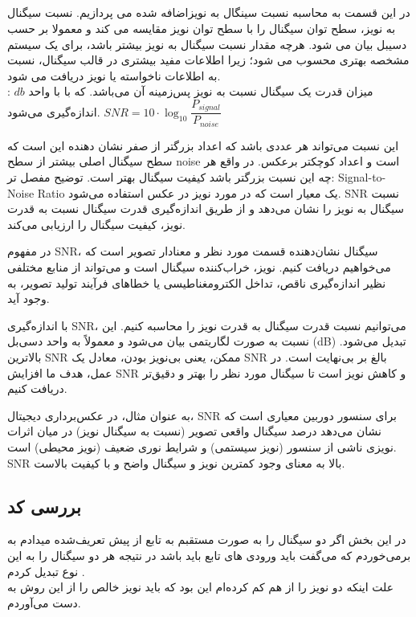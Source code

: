 \subsection{}
در این قسمت به محاسبه نسبت سینگال به نویزاضافه شده‌ می پردازیم. 
نسبت سیگنال به نویز، سطح توان سیگنال را با سطح توان نویز مقایسه می کند و معمولا بر حسب دسیبل بیان
می شود. هرچه مقدار نسبت سیگنال به نویز بیشتر باشد، برای یک سیستم مشخصه بهتری محسوب می شود؛
زیرا اطلاعات مفید بیشتری در قالب سیگنال، نسبت به اطلاعات ناخواسته یا نویز دریافت می شود.
\\
:
میزان قدرت یک سیگنال نسبت به نویز پس‌زمینه آن می‌باشد.
که با با واحد 
\(db\)
اندازه‌گیری می‌شود.
\null \hfill $ SNR =  10 \cdot \log_{10} \dfrac{P_{signal}}{P_{noise}}$

این نسبت می‌تواند هر عددی باشد که اعداد بزرگتر از صفر نشان دهنده این است که سطح سیگنال اصلی بیشتر از سطح noise است 
و اعداد کوچکتر برعکس. 
در واقع هر چه این نسبت بزرگتر باشد کیفیت سیگنال بهتر است.
\BlankLine
توضیح مفصل تر:
\BlankLine
Signal-to-Noise Ratio
یک معیار است که در مورد نویز در عکس استفاده می‌شود. SNR نسبت سیگنال به نویز را نشان می‌دهد و از طریق اندازه‌گیری قدرت سیگنال نسبت به قدرت نویز، کیفیت سیگنال را ارزیابی می‌کند.

در مفهوم SNR، سیگنال نشان‌دهنده قسمت مورد نظر و معنادار تصویر است که می‌خواهیم دریافت کنیم. نویز، خراب‌کننده سیگنال است و می‌تواند از منابع مختلفی نظیر اندازه‌گیری ناقص، تداخل الکترومغناطیسی یا خطاهای فرآیند تولید تصویر، به وجود آید.

با اندازه‌گیری SNR، می‌توانیم نسبت قدرت سیگنال به قدرت نویز را محاسبه کنیم. این نسبت به صورت لگاریتمی بیان می‌شود و معمولاً به واحد دسی‌بل (dB) تبدیل می‌شود. بالاترین SNR ممکن، یعنی بی‌نویز بودن، معادل یک SNR بالغ بر بی‌نهایت است. در عمل، هدف ما افزایش SNR و کاهش نویز است تا سیگنال مورد نظر را بهتر و دقیق‌تر دریافت کنیم.

به عنوان مثال، در عکس‌برداری دیجیتال، SNR برای سنسور دوربین معیاری است که نشان می‌دهد درصد سیگنال واقعی تصویر (نسبت به سیگنال نویز) در میان اثرات نویزی ناشی از سنسور (نویز سیستمی) و شرایط نوری ضعیف (نویز محیطی) است. SNR بالا به معنای وجود کمترین نویز و سیگنال واضح و با کیفیت بالاست.
\subsection{بررسی کد}
\lr{}

در این بخش اگر دو سیگنال را به صورت مستقبم به تابع از پیش تعریف‌شده 
میدادم به
برمی‌خوردم که می‌گفت باید ورودی های تابع 
باید 
باشد در نتیجه هر دو سیگنال را به این نوع تبدیل کردم .
\\
علت اینکه دو نویز را از هم کم کرده‌ام این بود که باید نویز خالص را از این روش به دست می‌آوردم.

